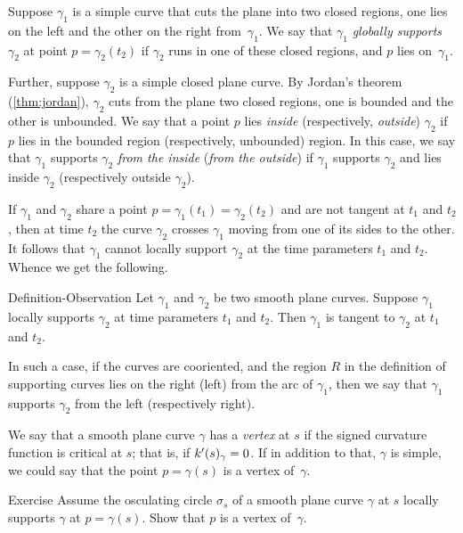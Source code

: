 Suppose $\gamma_1$ is a simple curve that cuts the plane into two closed regions, one lies on the left and the other on the right from~$\gamma_1$.
We say that $\gamma_1$ \emph{globally supports} $\gamma_2$ at point $p=\gamma_2(t_2)$ 
if $\gamma_2$ runs in one of these closed regions, and 
$p$ lies on~$\gamma_1$.

Further, suppose $\gamma_2$ is a simple closed plane curve.
By Jordan's theorem (\ref{thm:jordan}), $\gamma_2$ cuts from the plane two closed regions, one is bounded and the other is unbounded.
We say that a point $p$ lies {}\emph{inside} (respectively, {}\emph{outside}) $\gamma_2$ if $p$ lies in the bounded region (respectively, unbounded) region.
In this case, we say that $\gamma_1$ supports $\gamma_2$ \emph{from the inside} (\emph{from the outside}) if $\gamma_1$ supports $\gamma_2$ and lies inside $\gamma_2$ (respectively outside $\gamma_2$). 

If $\gamma_1$ and $\gamma_2$ share a point $p=\gamma_1(t_1)=\gamma_2(t_2)$ and are not tangent at $t_1$ and $t_2$, then at time $t_2$ the curve $\gamma_2$ crosses $\gamma_1$  moving from one of its sides to the other.
It follows that $\gamma_1$ cannot locally support $\gamma_2$ at the time parameters $t_1$ and $t_2$.
Whence we get the following.

\begin{thm}{Definition-Observation}
Let $\gamma_1$ and $\gamma_2$ be two smooth plane curves.
Suppose $\gamma_1$ locally supports $\gamma_2$ at time parameters $t_1$ and $t_2$.
Then $\gamma_1$ is tangent to $\gamma_2$ at $t_1$ and $t_2$.

In such a case, if the curves are cooriented, and the region $R$ in the definition of supporting curves lies on the right (left) from the arc of $\gamma_1$, then we say that 
$\gamma_1$ supports $\gamma_2$ from the left (respectively right).
\end{thm}

We say that a smooth plane curve $\gamma$ has a \emph{vertex} at $s$
if the signed curvature function is critical at $s$;
that is, if $k'(s)_\gamma=0$.
If in addition to that, $\gamma$ is simple, we could say that the point $p=\gamma(s)$ is a vertex of~$\gamma$.

\begin{thm}{Exercise}\label{ex:vertex-support}
Assume the osculating circle $\sigma_s$ of a smooth plane curve $\gamma$ at $s$ locally supports $\gamma$ at $p=\gamma(s)$.
Show that $p$ is a vertex of~$\gamma$.
\end{thm}

